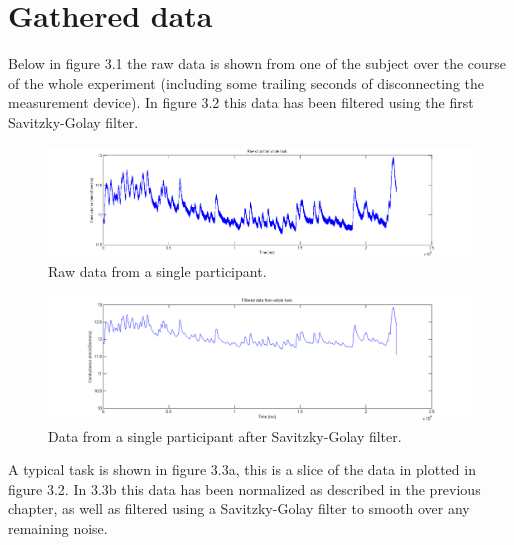 \documentclass[11pt,leqno,a4paper]{report} %
\begin{document}
\section{Gathered data}

Below in figure 3.1 the raw data is shown from one of the subject over the course of the whole experiment (including some trailing seconds of disconnecting the measurement device). In figure 3.2 this data has been filtered using the first Savitzky-Golay filter.


\begin{figure}[H]
  \centering
    \hspace*{-.25\textwidth}   
    \includegraphics[width=1.5\textwidth]{measurements/raw.png}
  \caption{Raw data from a single participant.}
\end{figure}

\begin{figure}[H]
  \centering
 	\hspace*{-.25\textwidth}   
 	\includegraphics[width=1.5\textwidth]{measurements/filtered.png}
  \caption{Data from a single participant after Savitzky-Golay filter.}
\end{figure}

A typical task is shown in figure 3.3a, this is a slice of the data in plotted in figure 3.2. In 3.3b this data has been normalized as described in the previous chapter, as well as filtered using a Savitzky-Golay filter to smooth over any remaining noise.

\end{document}
